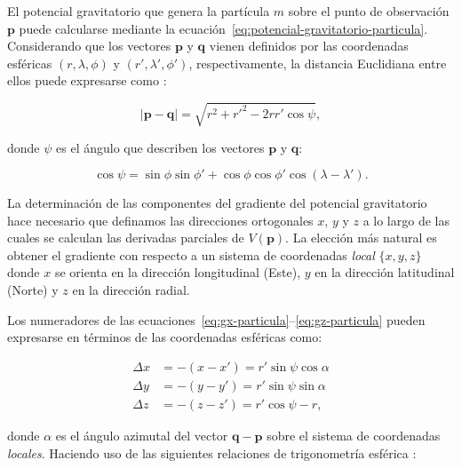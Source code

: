 El potencial gravitatorio que genera la partícula $m$ sobre el punto de
observación $\mathbf{p}$ puede calcularse mediante la
ecuación~\ref{eq:potencial-gravitatorio-particula}.
Considerando que los vectores $\mathbf{p}$ y $\mathbf{q}$ vienen definidos por
las coordenadas esféricas $(r, \lambda, \phi)$ y $(r', \lambda', \phi')$,
respectivamente, la distancia Euclidiana entre ellos puede expresarse como
\citep{grombein2013}:

\begin{equation}
    |\mathbf{p} - \mathbf{q}| = \sqrt{
        r^2 + r'^2 - 2rr'\cos\psi
    },
    \label{eq:distance-spherical}
\end{equation}

\noindent donde $\psi$ es el ángulo que describen los vectores $\mathbf{p}$
y $\mathbf{q}$:

\begin{equation}
    \cos \psi =
        \sin \phi \sin \phi' + \cos \phi \cos \phi' \cos(\lambda - \lambda').
    \label{eq:cosphi}
\end{equation}

La determinación de las componentes del gradiente del potencial gravitatorio
hace necesario que definamos las direcciones ortogonales $x$, $y$ y $z$ a lo
largo de las cuales se calculan las derivadas parciales de $V(\mathbf{p})$.
La elección más natural es obtener el gradiente con respecto a un sistema de
coordenadas \emph{local} $\{x, y, z\}$ \citep{grombein2013,uieda2016} donde $x$
se orienta en la dirección longitudinal (Este), $y$ en la dirección latitudinal
(Norte) y $z$ en la dirección radial.

Los numeradores de las ecuaciones~\ref{eq:gx-particula}--\ref{eq:gz-particula}
pueden expresarse en términos de las coordenadas esféricas como:

\begin{align}
    \Delta x &= - (x - x') = r' \sin\psi \cos\alpha
    \label{eq:delta-x-raw}
    \\
    \Delta y &= - (y - y') = r' \sin\psi \sin\alpha
    \label{eq:delta-y-raw}
    \\
    \Delta z &= - (z - z') = r'\cos\psi - r,
    \label{eq:delta-z-raw}
\end{align}

\noindent donde $\alpha$ es el ángulo azimutal del vector
$\mathbf{q} - \mathbf{p}$ sobre el sistema de coordenadas \emph{locales}.
Haciendo uso de las siguientes relaciones de trigonometría esférica
\citep[][p.~113]{heiskanen1967}:

